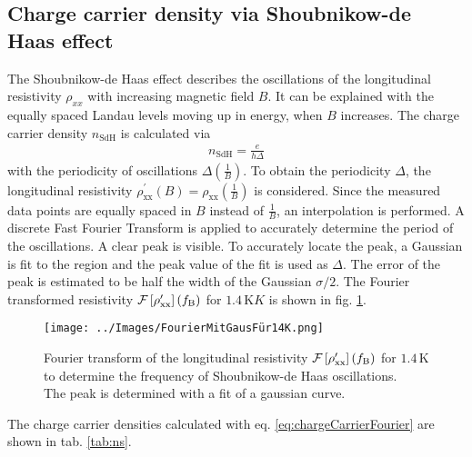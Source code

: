 \subsection{Charge carrier density via Shoubnikow-de Haas effect}
The Shoubnikow-de Haas effect describes the oscillations of the longitudinal resistivity $\rho_{xx}$ with increasing magnetic field $B$.
It can be explained with the equally spaced Landau levels moving up in energy, when $B$ increases.
The charge carrier density $n_\text{SdH}$ is calculated via
\begin{align}
    n_\text{SdH} = \frac{e}{h\Delta}
    \label{eq:chargeCarrierFourier}
\end{align} 
with the periodicity of oscillations $\Delta\left(\frac{1}{B}\right)$.
To obtain the periodicity $\Delta$, the longitudinal resistivity $\rho^\prime_\text{xx}\left(B\right)=\rho_\text{xx}\left(\frac{1}{B}\right)$ is considered.
Since the measured data points are equally spaced in $B$ instead of $\frac{1}{B}$, an interpolation is performed.
A discrete Fast Fourier Transform is applied to accurately determine the period of the oscillations.
A clear peak is visible.
To accurately locate the peak, a Gaussian is fit to the region and the peak value of the fit is used as $\Delta$.
The error of the peak is estimated to be half the width of the Gaussian $\sigma / 2$.
The Fourier transformed resistivity $\mathcal{F}\left[ \rho^\prime_\text{xx}\right]\left(f_\text B\right)$ for $1.4\,\text{K}K$ is shown in fig. \ref{fig:Fourier}.
\begin{figure}[h]
    \centering
    \texttt{[image: ../Images/FourierMitGausFür14K.png]}
    \caption{Fourier transform of the longitudinal resistivity 
    $\mathcal{F}\left[ \rho^\prime_\text{xx}\right]\left(f_\text B\right)$ 
    for $1.4\,\text{K}$ to determine the frequency of Shoubnikow-de Haas oscillations.\\
    The peak is determined with a fit of a gaussian curve.
    }
    \label{fig:Fourier}
\end{figure}
The charge carrier densities calculated with eq. \ref{eq:chargeCarrierFourier} are shown in tab. \ref{tab:ns}.
